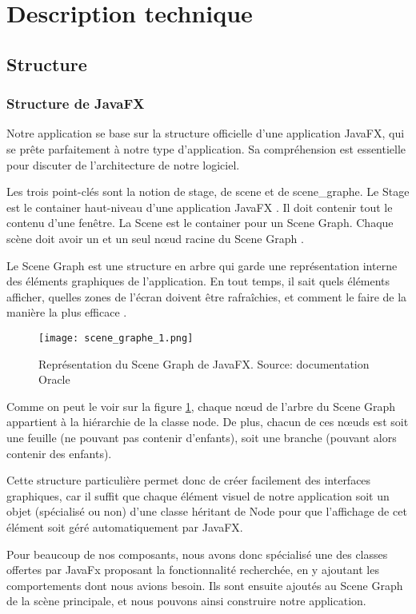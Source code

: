 \section{Description technique}

\subsection{Structure}
\subsubsection{Structure de JavaFX}
Notre application se base sur la structure officielle d'une application JavaFX, qui se prête parfaitement à notre type d'application. Sa compréhension est essentielle pour discuter de l'architecture de notre logiciel.
\par
Les trois point-clés sont la notion de \gls{stage}, de \gls{scene} et de \gls{scene_graphe}. Le Stage est le container haut-niveau d'une application JavaFX \cite{javadoc_stage}. Il doit contenir tout le contenu d'une fenêtre. La Scene est le container pour un Scene Graph. Chaque scène doit avoir un et un seul n\oe ud racine du Scene Graph \cite{javadoc_scene}.
\par
Le Scene Graph est une structure en arbre qui garde une représentation interne des éléments graphiques de l'application. En tout temps, il sait quels éléments afficher, quelles zones de l'écran doivent être rafraîchies, et comment le faire de la manière la plus efficace \cite{javadoc_scene_graphe}. 	

\begin{figure}[H]
	\caption{Représentation du Scene Graph de JavaFX. Source: documentation Oracle \cite{javadoc_scene_graphe}}
	\centering
	\texttt{[image: scene\_graphe\_1.png]}
	\label{fig:scene_graphe_1}
\end{figure}
Comme on peut le voir sur la figure \ref{fig:scene_graphe_1}, chaque n\oe ud de l'arbre du Scene Graph appartient à la hiérarchie de la classe \gls{node}. De plus, chacun de ces n\oe uds est soit une feuille (ne pouvant pas contenir d'enfants), soit une branche (pouvant alors contenir des enfants).
\par
Cette structure particulière permet donc de créer facilement des interfaces graphiques, car il suffit que chaque élément visuel de notre application soit un objet (spécialisé ou non) d'une classe héritant de Node pour que l'affichage de cet élément soit géré automatiquement par JavaFX.
\par
Pour beaucoup de nos composants, nous avons donc spécialisé une des classes offertes par JavaFx proposant la fonctionnalité recherchée, en y ajoutant les comportements dont nous avions besoin. Ils sont ensuite ajoutés au Scene Graph de la scène principale, et nous pouvons ainsi construire notre application.

